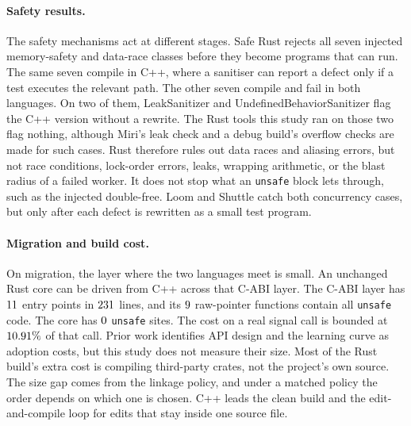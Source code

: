 \documentclass[english,oneside,a4paper,censored,csm,software-track-2020]{HYthesisML}
\begin{document}
\paragraph{Safety results.}
The safety mechanisms act at different stages. Safe Rust rejects all seven
injected memory-safety and data-race classes before they become programs that
can run. The same seven compile in C++, where a sanitiser can report a defect
only if a test executes the relevant path. The other seven compile and fail in
both languages. On two of them, LeakSanitizer and UndefinedBehaviorSanitizer
flag the C++ version without a rewrite. The Rust tools this study ran on those
two flag nothing, although Miri's leak check and a debug build's overflow
checks are made for such cases. Rust therefore rules out data races and
aliasing errors, but not race conditions, lock-order errors, leaks, wrapping
arithmetic, or the blast radius of a failed worker. It does not stop what an
\texttt{unsafe} block lets through, such as the injected double-free. Loom and
Shuttle catch both concurrency cases, but only after each defect is rewritten as
a small test program.

\paragraph{Migration and build cost.}
On migration, the layer where the two languages meet is small. An unchanged
Rust core can be driven from C++ across that C-ABI layer. The
C-ABI layer has $11$ entry points in $231$ lines, and its
$9$ raw-pointer functions contain all \texttt{unsafe} code. The
core has $0$ \texttt{unsafe} sites. The cost on a real signal call is
bounded at $10.91\%$ of that call.
Prior work identifies API design and the learning curve as adoption costs, but
this study does not measure their size.
Most of the Rust build's extra cost is compiling third-party crates, not the
project's own source. The size gap comes from the linkage policy, and under a
matched policy the order depends on which one is chosen. C++ leads the clean build and the
edit-and-compile loop for edits that stay inside one source file.
\end{document}
